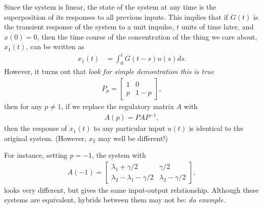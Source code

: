 \documentclass[11 pt]{article}
\newcommand{\plr}[1]{{\color{blue}\it #1}}
\begin{document}
Since the system is linear, the state of the system at any time
is the superposition of its responses to all previous inputs.
This implies that 
if $G(t)$ is the transient response of the system to a unit impulse,
$t$ units of time later,
and $x(0) = 0$,
then the time course of the concentration of the thing we care about, $x_1(t)$, 
can be written as
\begin{align} \label{eqn:ex_convolution}
    x_1(t) &= \int_0^t G(t-s) u(s) ds .
\end{align}
However, it turns out that 
\plr{look for simple demontration this is true}
\begin{align*}
    P_{p} = \left[\begin{matrix} 
        1 & 0 \\ 
        p & 1-p 
    \end{matrix}\right],
\end{align*}
then for any $p \neq 1$, 
if we replace the regulatory matrix $A$ with
\begin{align*}
    A(p) = P A P^{-1},
\end{align*}
then the response of $x_1(t)$ to any particular input $u(t)$ is identical to the original system.
(However, $x_2$ may well be different!)

For instance, setting $p=-1$,
the system with
\begin{align*}
    A(-1) = \left[\begin{matrix} 
        \lambda_1 + \gamma/2 & \gamma/2 \\ 
        \lambda_2-\lambda_1-\gamma/2 & \lambda_2 - \gamma/2
    \end{matrix}\right],
\end{align*}
looks very different, but gives the same input-output relationship.
Although these systems are equivalent,
hybrids between them may not be:
\plr{do example}.
\end{document}
